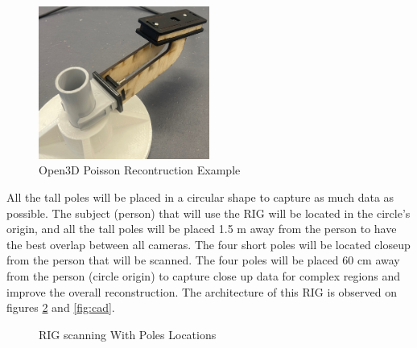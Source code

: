 \documentclass[12pt]{report}
\begin{document}
\begin{figure}[H]
  \hspace*{0.8cm}  
  \includegraphics[width=0.5\textwidth]{IMG_5896_cropped.jpg}
  \captionsetup{singlelinecheck = false, format= hang, justification=raggedright,  labelsep=space}
 \caption{Open3D Poisson Recontruction Example}
 \label{fig:short_pole} 
\end{figure}

All the tall poles will be placed in a circular shape to capture as much data as possible. 
The subject (person) that will use the RIG will be located in the circle's origin, and all the tall poles will be placed 1.5 m away from the person to have the best overlap between all cameras.
The four short poles will be located closeup from the person that will be scanned. The four poles will be placed 60 cm away from the person (circle origin) to capture close up data for complex regions and improve the overall reconstruction.
The architecture of this RIG is observed on figures \ref{fig:RIG}  and \ref{fig:cad}.
\enlargethispage{\baselineskip}

\newpage

\begin{figure}[H]
  \centering
  \qquad
  \caption{RIG scanning With Poles Locations}
  \label{fig:RIG}
\end{figure}
\end{document}
